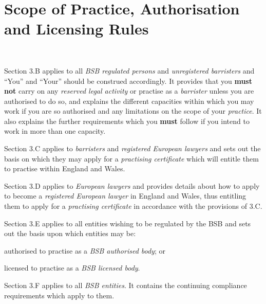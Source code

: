 \part{Scope of Practice, Authorisation and Licensing Rules}






~

Section 3.B applies to all \emph{BSB regulated persons} and
\emph{unregistered barristers} and ``You'' and ``Your'' should be
construed accordingly. It provides that you \textcolor{myred}{\textbf{must not }}carry on any
\emph{reserved legal activity} or practise as a \emph{barrister} unless
you are authorised to do so, and explains the different capacities
within which you may work if you are so authorised and any limitations
on the scope of your \emph{practice}. It also explains the further
requirements which you \textcolor{myred}{\textbf{must }}follow if you intend to work in more than
one capacity.~


Section 3.C applies to \emph{barristers} and \emph{registered European
lawyers} and sets out the basis on which they may apply for a
\emph{practising certificate} which will entitle them to practise within
England and Wales.


Section 3.D applies to \emph{European lawyers} and provides details
about how to apply to become a \emph{registered European lawyer} in
England and Wales, thus entitling them to apply for a \emph{practising
certificate} in accordance with the provisions of 3.C.


Section 3.E applies to all entities wishing to be regulated by the BSB
and sets out the basis upon which entities may be:
\nl\item authorised to practise as a \emph{BSB authorised body}; or
\item licensed to practise as a \emph{BSB licensed body}.
\ln
{}

Section 3.F applies to all \emph{BSB entities}. It contains the
continuing compliance requirements which apply to them.







